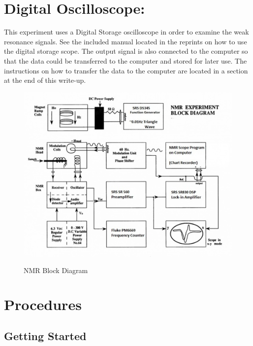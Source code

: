 \documentclass{../lab}
\begin{document}
\section{Digital Oscilloscope:}

This experiment uses a Digital Storage oscilloscope in order to examine the weak resonance signals. See the included manual located in the reprints on how to use the digital storage scope. The output signal is also connected to the computer so that the data could be transferred to the computer and stored for later use. The instructions on how to transfer the data to the computer are located in a section at the end of this write-up.

\begin{figure}[h]
    \centering
    \href{http://experimentationlab.berkeley.edu/sites/default/files/images/500px-NMRblockdiagram.jpg}{\includegraphics[width=0.6\linewidth]{images/500px-NMRblockdiagram.jpg}}
    \caption{NMR Block Diagram}
    \label{fig:500px-NMRblockdiagram}
\end{figure}

\section{Procedures}

\subsection{Getting Started}
\end{document}
